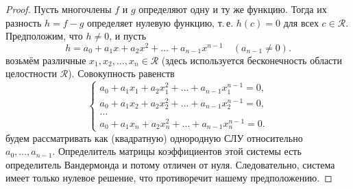 \begin{proof}
    Пусть многочлены $f$ и $g$ определяют одну и ту же функцию. Тогда их разность $h = f - g$ определяет нулевую функцию, т.\,е. $h(c) = 0$ для всех $c \in \mathcal{R}$. Предположим, что $h \ne 0$, и пусть
    $$
    h = a_0 + a_1x + a_2x^2 + \ldots + a_{n - 1}x^{n - 1}\quad(a_{n - 1} \ne 0).
    $$
    возьмём различные $x_1, x_2, \ldots, x_n \in \mathcal{R}$ (здесь используется бесконечность области целостности $\mathcal{R}$). Совокупность равенств
    $$
    \begin{cases}
        a_0 + a_1x_1 + a_2x_1^2 + \ldots + a_{n - 1}x_1^{n - 1} = 0,\\
        a_0 + a_1x_2 + a_2x_2^2 + \ldots + a_{n - 1}x_2^{n - 1} = 0,\\
        \ldots\\
        a_0 + a_1x_n + a_2x_n^2 + \ldots + a_{n - 1}x_n^{n - 1} = 0.
    \end{cases}
    $$
    будем рассматривать как (квадратную) однородную СЛУ относительно $a_0, \ldots, a_{n - 1}$. Определитель матрицы коэффициентов этой системы есть определитель Вандермонда и потому отличен от нуля. Следовательно, система имеет только нулевое решение, что противоречит нашему предположению.
\end{proof}


